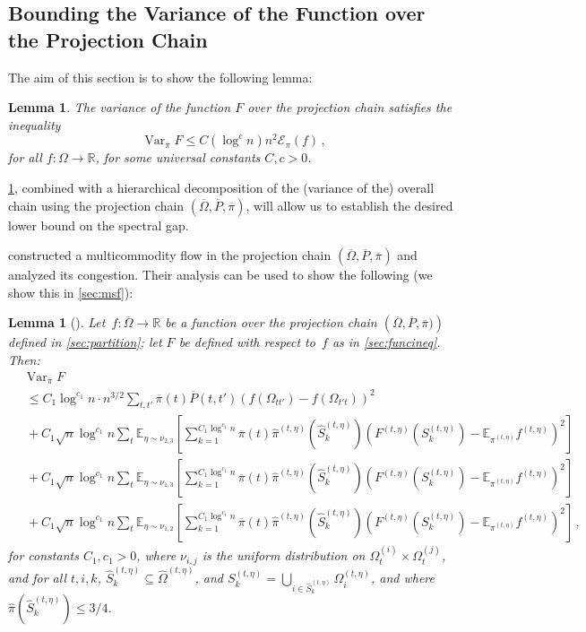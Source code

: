\documentclass[a4paper, 12p]{article}
\numberwithin{equation}{section}
\newcommand{\Exp}{\mathbb{E}}
\newcommand{\FF}{F}
\newcommand{\Omproj}{\overline{\Omega}}
\newcommand{\piproj}{\overline{\pi}}
\newcommand{\Pproj}{\overline{P}}
\newcommand{\Omorproj}{\hat{\Omega}}
\newcommand{\piorproj}{\hat{\pi}}
\newcommand{\var}{\operatorname{Var}}
\newcommand{\dir}{\mathcal{E}}
\newcommand{\Om}{\Omega}
\newtheorem{lemma}[theorem]{Lemma}
\begin{document}
\subsection{Bounding the Variance of the Function over the Projection Chain}\label{sec:boundprojvar}
The aim of this section is to show the following lemma:

\begin{lemma}\label{lem:boundprojvar}
    The variance of the function $\FF$ over the projection chain satisfies the inequality
    $$\var_{\piproj} \FF \leq C(\log^{c}n)n^{2} \dir_{\pi}(f)\,,$$
    for all $f:\Om\to\mathbb{R}$, for some universal constants $C,c>0$.
\end{lemma}

\cref{lem:boundprojvar}, combined with a hierarchical decomposition of the (variance of the) overall chain using the projection chain $(\Omproj, \Pproj, \piproj)$, will allow us to establish the desired lower bound on the spectral gap.

\cite{eppstein2022improved} constructed a multicommodity flow in the projection chain $(\Omproj, \Pproj, \piproj)$ and analyzed its congestion. Their analysis can be used to show the following (we show this in \cref{sec:msf}):

\begin{lemma}[\cite{eppstein2022improved}]
Let~$f:\Omproj \rightarrow \mathbb{R}$ be a function over the projection chain $\left(\Omproj, \Pproj, \piproj)\right)$ defined in \cref{sec:partition}; let $\FF$ be defined with respect to~$f$ as in \cref{sec:funcineq}. Then:
{\small
\begin{align}
    &\var_{\piproj} F\nonumber\\
    &~\leq C_1\log^{c_1} n  \cdot n^{3/2} \sum_{t, t'} \piproj(t)\Pproj(t, t')(f(\Omega_{t t'}) - f(\Omega_{t' t}))^2 \label{eqn:bdryterm} \\
    &~+ C_1  \sqrt n\log^{c_1} n  \sum_{t} \Exp_{\eta \sim \nu_{2,3}}\left[ \sum_{k = 1}^{C_1 \log^{c_1} n} \piproj(t)\piorproj^{(t,\eta)}\left(\hat S_k^{(t,\eta)}\right)\left(\FF^{(t,\eta)}(S_k^{(t,\eta)}) - \Exp_{\pi^{(t,\eta)}} f^{(t,\eta)}\right)^2\right] \nonumber \\
    &~+ C_1\sqrt{n}\log^{c_1} n\sum_{t}\Exp_{\eta \sim \nu_{1,3}} \left[ \sum_{k = 1}^{C_1 \log^{c_1} n} \piproj(t)\piorproj^{(t,\eta)}\left(\hat S_k^{(t,\eta)}\right)\left(\FF^{(t,\eta)}(S_k^{(t,\eta)}) - \Exp_{\pi^{(t,\eta)}} f^{(t,\eta)}\right)^2\right] \nonumber \\
    &~+ C_1\sqrt n \log^{c_1} n  \sum_{t} \Exp_{\eta \sim \nu_{1,2}}\left[ \sum_{k = 1}^{C_1 \log^{c_1} n} \piproj(t)\piorproj^{(t,\eta)}\left(\hat S_k^{(t,\eta)}\right)\left(\FF^{(t,\eta)}(S_k^{(t,\eta)}) - \Exp_{\pi^{(t,\eta)}} f^{(t,\eta)}\right)^2\right]\,, \label{eqn:Ssetterm}
\end{align}}
for constants $C_1, c_1 > 0$,
where $\nu_{i,j}$ is the uniform distribution on $\Omega_t^{(i)} \times \Omega_t^{(j)}$, and
for all $t, i, k$, $\hat S_k^{(t,\eta)} \subseteq \Omorproj^{(t,\eta)}$, and $S_k^{(t,\eta)} = \bigcup_{i\in \hat S_k^{(t,\eta)}}\Omega_i^{(t,\eta)}$, and where $\piorproj(\hat S_k^{(t,\eta)}) \leq 3/4$.
\label{lem:flowreduction}
\end{lemma}
\end{document}

